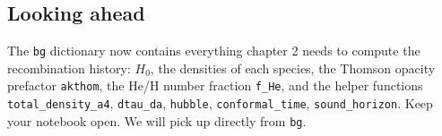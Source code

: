\subsection{Looking ahead}

The \texttt{bg} dictionary now contains everything chapter 2 needs to compute the recombination history: $H_0$, the densities of each species, the Thomson opacity prefactor \texttt{akthom}, the He/H number fraction \texttt{f\_He}, and the helper functions \texttt{total\_density\_a4}, \texttt{dtau\_da}, \texttt{hubble}, \texttt{conformal\_time}, \texttt{sound\_horizon}. Keep your notebook open. We will pick up directly from \texttt{bg}.
